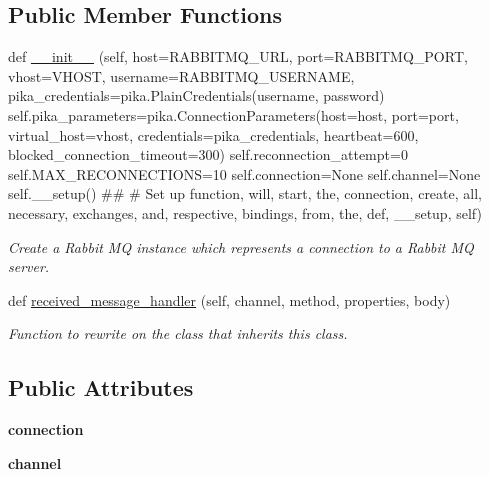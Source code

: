 \subsection*{Public Member Functions}
\begin{DoxyCompactItemize}
\item 
def \hyperlink{classtwitter_1_1wrappers_1_1rabbitmq__wrapper_1_1Rabbitmq_a62d86eb0c3c5f086500ef0097f9efd65}{\+\_\+\+\_\+init\+\_\+\+\_\+} (self, host=R\+A\+B\+B\+I\+T\+M\+Q\+\_\+\+U\+RL, port=R\+A\+B\+B\+I\+T\+M\+Q\+\_\+\+P\+O\+RT, vhost=V\+H\+O\+ST, username=R\+A\+B\+B\+I\+T\+M\+Q\+\_\+\+U\+S\+E\+R\+N\+A\+ME, pika\+\_\+credentials=pika.\+Plain\+Credentials(username, password) self.\+pika\+\_\+parameters=pika.\+Connection\+Parameters(host=host, port=port, virtual\+\_\+host=vhost, credentials=pika\+\_\+credentials, heartbeat=600, blocked\+\_\+connection\+\_\+timeout=300) self.\+reconnection\+\_\+attempt=0 self.\+M\+A\+X\+\_\+\+R\+E\+C\+O\+N\+N\+E\+C\+T\+I\+O\+NS=10 self.\+connection=None self.\+channel=None self.\+\_\+\+\_\+setup() \#\# \# Set up function, will, start, the, connection, create, all, necessary, exchanges, and, respective, bindings, from, the, def, \+\_\+\+\_\+setup, self)
\begin{DoxyCompactList}\small\item\em Create a Rabbit MQ instance which represents a connection to a Rabbit MQ server. \end{DoxyCompactList}\item 
\mbox{\label{classtwitter_1_1wrappers_1_1rabbitmq__wrapper_1_1Rabbitmq_a910cadec1f119ffca78becc55af22a43}} 
def \hyperlink{classtwitter_1_1wrappers_1_1rabbitmq__wrapper_1_1Rabbitmq_a910cadec1f119ffca78becc55af22a43}{received\+\_\+message\+\_\+handler} (self, channel, method, properties, body)
\begin{DoxyCompactList}\small\item\em Function to rewrite on the class that inherits this class. \end{DoxyCompactList}\end{DoxyCompactItemize}
\subsection*{Public Attributes}
\begin{DoxyCompactItemize}
\item 
\mbox{\label{classtwitter_1_1wrappers_1_1rabbitmq__wrapper_1_1Rabbitmq_aa9419b8984be09e42873e11572e93139}} 
{\bfseries connection}
\item 
\mbox{\label{classtwitter_1_1wrappers_1_1rabbitmq__wrapper_1_1Rabbitmq_a049721cef6898206c8e6dab244b144fd}} 
{\bfseries channel}
\end{DoxyCompactItemize}
